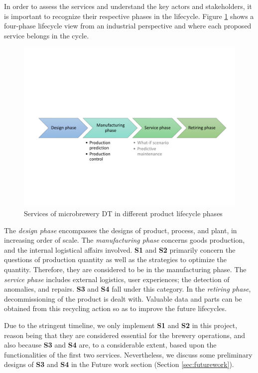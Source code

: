 \begin{itemize}
	In order to assess the services and understand the key actors and stakeholders, it is important to recognize their respective phases in the lifecycle. Figure \ref{fig:lifecycle} shows a four-phase lifecycle view \cite{Liu2021} from an industrial perspective and where each proposed service belongs in the cycle.
	\begin{figure}[hbt!]
		\centering
		\includegraphics[scale=0.5]{figures/lifecycle.pdf}
		\caption{Services of microbrewery DT in different product lifecycle phases}
		\label{fig:lifecycle}
	\end{figure}
	
The \textit{design phase} encompasses the designs of product, process, and plant, in increasing order of scale. The \textit{manufacturing phase} concerns goods production, and the internal logistical affairs involved. \textbf{S1} and \textbf{S2} primarily concern the questions of production quantity as well as the strategies to optimize the quantity. Therefore, they are considered to be in the manufacturing phase. The \textit{service phase} includes external logistics, user experiences; the detection of anomalies, and repairs. \textbf{S3} and \textbf{S4} fall under this category. In the \textit{retiring phase}, decommissioning of the product is dealt with. Valuable data and parts can be obtained from this recycling action so as to improve the future lifecycles.

Due to the stringent timeline, we only implement \textbf{S1} and \textbf{S2} in this project, reason being that they are considered essential for the brewery operations, and also because \textbf{S3} and \textbf{S4} are, to a considerable extent, based upon the functionalities of the first two services. Nevertheless, we discuss some preliminary designs of \textbf{S3} and \textbf{S4} in the Future work section (Section \ref{sec:futurework}).


\end{itemize}
